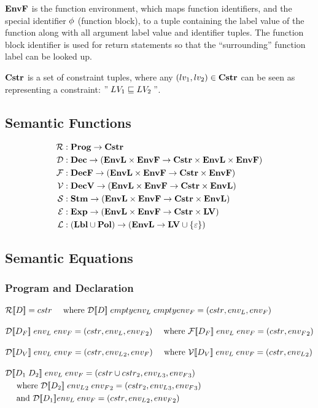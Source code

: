 $\mathbf{EnvF}$ is the function environment, which maps function identifiers, and the special identifier $\phi$ (function block), to a tuple containing the label value of the function along with all argument label value and identifier tuples.
The function block identifier is used for return statements so that the ``surrounding'' function label can be looked up.

$\mathbf{Cstr}$ is a set of constraint tuples, where any $(lv_1, lv_2) \in \mathbf{Cstr}$ can be seen as representing a constraint: $" \; LV_1 \sqsubseteq LV_2 \; "$.

\subsection{Semantic Functions}
\begin{align*}
\mathcal{R} & : \mathbf{Prog} \rightarrow \mathbf{Cstr} \\
\mathcal{D} & : \mathbf{Dec} \rightarrow (\mathbf{EnvL} \times \mathbf{EnvF} \rightarrow \mathbf{Cstr} \times \mathbf{EnvL} \times \mathbf{EnvF}) \\
\mathcal{F} & : \mathbf{DecF} \rightarrow (\mathbf{EnvL} \times \mathbf{EnvF} \rightarrow \mathbf{Cstr} \times \mathbf{EnvF}) \\
\mathcal{V} & : \mathbf{DecV} \rightarrow (\mathbf{EnvL} \times \mathbf{EnvF} \rightarrow \mathbf{Cstr} \times \mathbf{EnvL}) \\
\mathcal{S} & : \mathbf{Stm} \rightarrow (\mathbf{EnvL} \times \mathbf{EnvF} \rightarrow \mathbf{Cstr} \times \mathbf{EnvL}) \\
\mathcal{E} & : \mathbf{Exp} \rightarrow (\mathbf{EnvL} \times \mathbf{EnvF} \rightarrow \mathbf{Cstr} \times \mathbf{LV}) \\
\mathcal{L} & : (\mathbf{Lbl} \cup \mathbf{Pol}) \rightarrow (\mathbf{EnvL} \rightarrow \mathbf{LV} \cup \{ \varepsilon \})
\end{align*}

\subsection{Semantic Equations}

\subsubsection{Program and Declaration}
\begin{align*}
& \iR\dblSq{D} = \icstr \dsWhere{\iD\dblSq{D} \; empty\ienvL \; empty\ienvF = (\icstr, \ienvL, \ienvF)} \rspace
& \iD\dblSq{D_F} \; \ienvL \; \ienvF = (\icstr, \ienvL, \ienvF_2) \dsWhere{\iF\dblSq{D_F} \; \ienvL \; \ienvF = (\icstr, \ienvF_2)} \rspace
& \iD\dblSq{D_V} \; \ienvL \; \ienvF = (\icstr, \ienvL_2, \ienvF) \dsWhere{\iV\dblSq{D_V} \; \ienvL \; \ienvF = (\icstr, \ienvL_2)} \rspace
& \iD\dblSq{D_1 \; D_2} \; \ienvL \; \ienvF = (\icstr \cup \icstr_2, \ienvL_3, \ienvF_3) \\
& \quad \text{ where } \iD\dblSq{D_2} \; \ienvL_2 \; \ienvF_2 = (\icstr_2, \ienvL_3, \ienvF_3) \\
& \quad \text{ and } \iD\dblSq{D_1} \ienvL \; \ienvF = (\icstr, \ienvL_2, \ienvF_2)
\end{align*}

